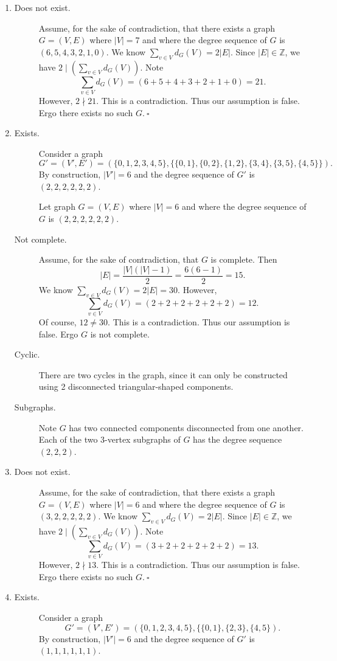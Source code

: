 \documentclass{article}
\newcommand{\Z}{\mathbb{Z}}
\theoremstyle{definition}
\begin{document}
\begin{solution}
\begin{enumerate}
\item\begin{description}
\item[Does not exist. ]Assume, for the sake of contradiction, that there exists a graph $G=(V,E)$ where $|V|=7$ and where the degree sequence of $G$ is $(6, 5, 4, 3, 2, 1, 0)$. We know $\sum_{v\in V}{d_G(V)}=2|E|$. Since $|E|\in\Z$, we have $2\mid\left(\sum_{v\in V}{d_G(V)}\right)$. Note \[\sum_{v\in V}{d_G(V)}=(6+5+4+3+2+1+0)=21.\] However, $2\nmid 21$. This is a contradiction. Thus our assumption is false. Ergo there exists no such $G.~\square$
\end{description}
\item\begin{description}
\item[Exists. ]Consider a graph \[G'=(V',E')=(\{0,1,2,3,4,5\},\{\{0,1\},\{0,2\},\{1,2\},\{3,4\},\{3,5\},\{4,5\}\}).\] By construction, $|V'|=6$ and the degree sequence of $G'$ is $(2,2,2,2,2,2)$.

Let graph $G=(V,E)$ where $|V|=6$ and where the degree sequence of $G$ is $(2,2,2,2,2,2)$.

\item[Not complete. ]Assume, for the sake of contradiction, that $G$ is complete. Then \[|E|=\frac{|V|(|V|-1)}{2}=\frac{6(6-1)}{2}=15.\] We know $\sum_{v\in V}{d_G(V)}=2|E|=30$. However, \[\sum_{v\in V}{d_G(V)}=(2+2+2+2+2+2)=12.\] Of course, $12\neq 30$. This is a contradiction. Thus our assumption is false. Ergo $G$ is not complete.
\item[Cyclic. ]There are two cycles in the graph, since it can only be constructed using 2 disconnected triangular-shaped components.
\item[Subgraphs. ]Note $G$ has two connected components disconnected from one another. Each of the two 3-vertex subgraphs of $G$ has the degree sequence $(2,2,2)$.
\end{description}
\item\begin{description}
\item[Does not exist. ]Assume, for the sake of contradiction, that there exists a graph $G=(V,E)$ where $|V|=6$ and where the degree sequence of $G$ is $(3, 2, 2, 2, 2, 2)$. We know $\sum_{v\in V}{d_G(V)}=2|E|$. Since $|E|\in\Z$, we have $2\mid\left(\sum_{v\in V}{d_G(V)}\right)$. Note \[\sum_{v\in V}{d_G(V)}=(3+2+2+2+2+2)=13.\] However, $2\nmid 13$. This is a contradiction. Thus our assumption is false. Ergo there exists no such $G.~\square$
\end{description}
\item\begin{description}
\item[Exists. ]Consider a graph \[G'=(V',E')=(\{0,1,2,3,4,5\},\{\{0,1\},\{2,3\},\{4,5\}).\] By construction, $|V'|=6$ and the degree sequence of $G'$ is $(1,1,1,1,1,1)$.


\end{description}
\end{enumerate}
\end{solution}
\end{document}
